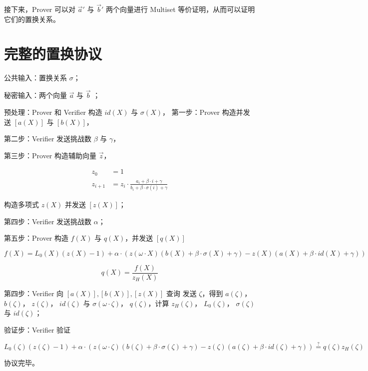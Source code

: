 接下来，Prover 可以对 \(\vec{a}'\) 与 \(\vec{b}'\) 两个向量进行 Multiset
等价证明，从而可以证明它们的置换关系。

\hypertarget{ux5b8cux6574ux7684ux7f6eux6362ux534fux8bae}{%
\section{完整的置换协议}\label{ux5b8cux6574ux7684ux7f6eux6362ux534fux8bae}}

公共输入：置换关系 \(\sigma\)；

秘密输入：两个向量 \(\vec{a}\) 与 \(\vec{b}\) ；

预处理：Prover 和 Verifier 构造 \(id(X)\) 与 \(\sigma(X)\)，
第一步：Prover 构造并发送 \([a(X)]\) 与 \([b(X)]\)，

第二步：Verifier 发送挑战数 \(\beta\) 与 \(\gamma\)，

第三步：Prover 构造辅助向量 \(\vec{z}\)，

\[
\begin{split}
z_0 &= 1 \\
z_{i+1} &= z_i\cdot \frac{a_i+\beta\cdot i + \gamma}{b_i+\beta\cdot \sigma(i) + \gamma}
\end{split}
\]

构造多项式 \(z(X)\) 并发送 \([z(X)]\)；

第四步：Verifier 发送挑战数 \(\alpha\)；

第五步：Prover 构造 \(f(X)\) 与 \(q(X)\)，并发送 \([q(X)]\)

\[
f(X)= L_0(X)(z(X)-1) + \alpha\cdot (z(\omega\cdot X)(b(X)+\beta\cdot\sigma(X)+\gamma)-z(X)(a(X)+\beta\cdot id(X)+\gamma)) 
\]

\[
q(X) = \frac{f(X)}{z_H(X)}
\]

第四步：Verifier 向 \([a(X)],[b(X)],[z(X)]\) 查询 发送 \(\zeta\)，得到
\(a(\zeta)\)， \(b(\zeta)\)， \(z(\zeta)\)， \(id(\zeta)\) 与
\(\sigma(\omega\cdot \zeta)\)， \(q(\zeta)\)，计算 \(z_H(\zeta)\)，
\(L_0(\zeta)\)， \(\sigma(\zeta)\) 与 \(id(\zeta)\)；

验证步：Verifier 验证

\[
L_0(\zeta)(z(\zeta)-1) + \alpha\cdot (z(\omega\cdot \zeta)(b(\zeta)+\beta\cdot\sigma(\zeta)+\gamma)-z(\zeta)(a(\zeta)+\beta\cdot id(\zeta)+\gamma)) \overset{?}{=} q(\zeta)z_H(\zeta)
\]

协议完毕。


